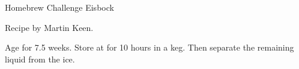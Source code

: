 \stylesection{\styleeisbock}

\begin{recipe}{Homebrew Challenge Eisbock} %

\begin{aboutblock}
Recipe by Martin Keen.
\sourcehomebrewchallenge
\end{aboutblock}


\begin{methodandtiming}

\begin{mashsteps}
\end{mashsteps}

\begin{fermentationsteps}
\end{fermentationsteps}

\begin{directions}
Age for 7.5 weeks. Store at  for 10 hours in a keg. Then separate the
remaining liquid from the ice.
\end{directions}

\end{methodandtiming}

\recipebreak

\begin{ingredientsblock}

\begin{malts}
\end{malts}

\begin{hops}
\end{hops}


\end{ingredientsblock}

\end{recipe}

